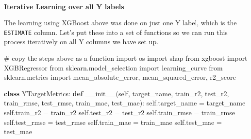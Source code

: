 \documentclass[
  letterpaper,
  DIV=11,
  numbers=noendperiod]{scrartcl}
\makeatletter
\let\oldparagraph\paragraph
\renewcommand{\paragraph}{
    \@ifstar
      \xxxParagraphStar
      \xxxParagraphNoStar
  }
\newcommand{\xxxParagraphStar}[1]{\oldparagraph*{#1}\mbox{}}
\newcommand{\xxxParagraphNoStar}[1]{\oldparagraph{#1}\mbox{}}
\newenvironment{Shaded}{\begin{snugshade}}{\end{snugshade}}
\newcommand{\CommentTok}[1]{\textcolor[rgb]{0.37,0.37,0.37}{#1}}
\newcommand{\FunctionTok}[1]{\textcolor[rgb]{0.28,0.35,0.67}{#1}}
\newcommand{\ImportTok}[1]{\textcolor[rgb]{0.00,0.46,0.62}{#1}}
\newcommand{\KeywordTok}[1]{\textcolor[rgb]{0.00,0.23,0.31}{\textbf{#1}}}
\newcommand{\NormalTok}[1]{\textcolor[rgb]{0.00,0.23,0.31}{#1}}
\newcommand{\OperatorTok}[1]{\textcolor[rgb]{0.37,0.37,0.37}{#1}}
\newcommand{\VariableTok}[1]{\textcolor[rgb]{0.07,0.07,0.07}{#1}}
\makeatother
\begin{document}
\paragraph{\texorpdfstring{\textbf{Iterative Learning over all Y
labels}}{Iterative Learning over all Y labels}}\label{iterative-learning-over-all-y-labels}

The learning using XGBoost above was done on just one Y label, which is
the \texttt{ESTIMATE} column. Let's put these into a set of functions so
we can run this process iteratively on all Y columns we have set up.

\begin{Shaded}
\begin{Highlighting}[]
\CommentTok{\# copy the steps above as a function}
\ImportTok{import}\NormalTok{ os }
\ImportTok{import}\NormalTok{ shap}
\ImportTok{from}\NormalTok{ xgboost }\ImportTok{import}\NormalTok{ XGBRegressor}
\ImportTok{from}\NormalTok{ sklearn.model\_selection }\ImportTok{import}\NormalTok{ learning\_curve}
\ImportTok{from}\NormalTok{ sklearn.metrics }\ImportTok{import}\NormalTok{ mean\_absolute\_error, mean\_squared\_error, r2\_score}

\KeywordTok{class}\NormalTok{ YTargetMetrics:}
    \KeywordTok{def} \FunctionTok{\_\_init\_\_}\NormalTok{(}\VariableTok{self}\NormalTok{, target\_name, train\_r2, test\_r2, train\_rmse, test\_rmse, train\_mae, test\_mae):}
        \VariableTok{self}\NormalTok{.target\_name }\OperatorTok{=}\NormalTok{ target\_name}
        \VariableTok{self}\NormalTok{.train\_r2 }\OperatorTok{=}\NormalTok{ train\_r2}
        \VariableTok{self}\NormalTok{.test\_r2 }\OperatorTok{=}\NormalTok{ test\_r2}
        \VariableTok{self}\NormalTok{.train\_rmse }\OperatorTok{=}\NormalTok{ train\_rmse}
        \VariableTok{self}\NormalTok{.test\_rmse }\OperatorTok{=}\NormalTok{ test\_rmse}
        \VariableTok{self}\NormalTok{.train\_mae }\OperatorTok{=}\NormalTok{ train\_mae}
        \VariableTok{self}\NormalTok{.test\_mae }\OperatorTok{=}\NormalTok{ test\_mae}


\end{Highlighting}
\end{Shaded}
\end{document}
